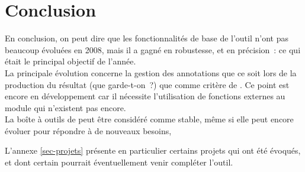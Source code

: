 \chapter{Conclusion}

En conclusion, on peut dire que les fonctionnalités de base de l'outil
n'ont pas beaucoup évoluées en 2008, mais il a gagné en robustesse,
et en précision~: ce qui était le principal objectif de l'année.\\

La principale évolution concerne la gestion des annotations
que ce soit lors de la production du résultat (que garde-t-on~?)
que comme critère de \slicing. Ce point est encore en développement
car il nécessite l'utilisation de fonctions externes au module
qui n'existent pas encore.\\

La boîte à outils de \slicing peut être considéré comme stable,
même si elle peut encore évoluer pour répondre à de nouveaux besoins,

L'annexe \ref{sec-projets} présente en particulier
certains projets qui ont été évoqués,
et dont certain pourrait éventuellement venir compléter l'outil.


